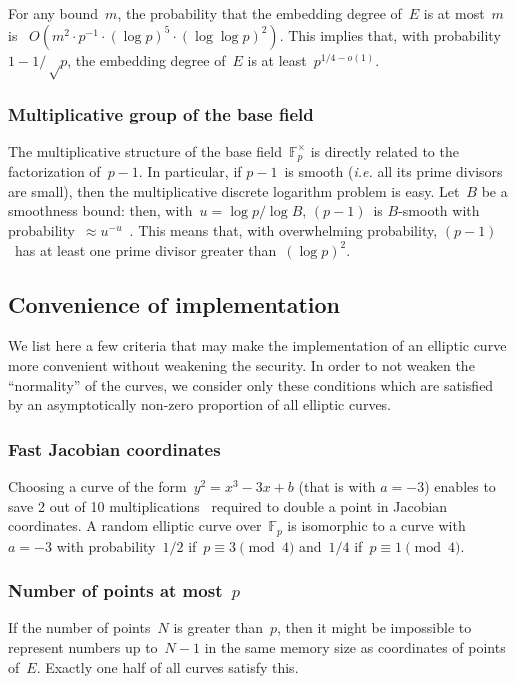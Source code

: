 \documentclass[twocolumn,letterpaper,10pt]{article}
\def\F{\mathbb{F}}
\begin{document}
For any bound~$m$, the probability that
the embedding degree of~$E$ is at most~$m$
is~\cite{jc1998bk} $O(m^2 · p^{-1}·(\log p)^5·(\log\log p)^2)$.
This implies that, with probability~$1 - 1/√p$,
the embedding degree of~$E$ is at least~$p^{1/4 - o(1)}$.

\subsubsection{Multiplicative group of the base field}

The multiplicative structure of the base field~$\F_p^{×}$
is directly related to the factorization of~$p-1$.
In particular, if $p-1$~is smooth
(\emph{i.e.} all its prime divisors are small),
then the multiplicative discrete logarithm problem is easy.
Let~$B$ be a smoothness bound: then, with~$u = \log p / \log B$,
$(p-1)$~is $B$-smooth with probability~$≈ u^{-u}$~\cite{jnt1983cep}.
This means that, with overwhelming probability,
$(p-1)$~has at least one prime divisor greater than~$(\log p)^2$.

\subsection{Convenience of implementation}
\label{ss:convenience}

We list here a few criteria that
may make the implementation of an elliptic curve more convenient
without weakening the security.
In order to not weaken the ``normality'' of the curves,
we consider only these conditions which are satisfied
by an asymptotically non-zero proportion of all elliptic curves.

\subsubsection{Fast Jacobian coordinates}

Choosing a curve of the form~$y^2 = x^3 - 3 x + b$ (that is with $a=-3$)
enables to save 2 out of 10 multiplications~\cite{ieeep1363}
required to double a point in Jacobian coordinates.
A random elliptic curve over~$\F_p$
is isomorphic to a curve with~$a = -3$
with probability~$1/2$ if~$p ≡ 3 \pmod{4}$ and~$1/4$ if~$p ≡ 1 \pmod{4}$.

\subsubsection{Number of points at most~\texorpdfstring{$p$}{p}}

If the number of points~$N$ is greater than~$p$,
then it might be impossible to represent numbers up to~$N-1$
in the same memory size as coordinates of points of~$E$.
Exactly one half of all curves satisfy this.
\end{document}
